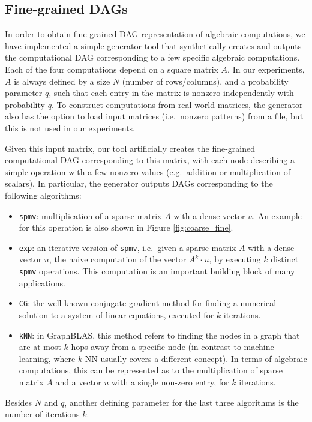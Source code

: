 \documentclass[sigconf,nonacm]{acmart}
\begin{document}
\subsection{Fine-grained DAGs}

In order to obtain fine-grained DAG representation of algebraic computations, we have implemented a simple generator tool that synthetically creates and outputs the computational DAG corresponding to a few specific algebraic computations. Each of the four computations depend on a square matrix $A$. In our experiments, $A$ is always defined by a size $N$ (number of rows/columns), and a probability parameter $q$, such that each entry in the matrix is nonzero independently with probability $q$. To construct computations from real-world matrices, the generator also has the option to load input matrices (i.e.\ nonzero patterns) from a file, but this is not used in our experiments.

Given this input matrix, our tool artificially creates the fine-grained computational DAG corresponding to this matrix, with each node describing a simple operation with a few nonzero values (e.g.\ addition or multiplication of scalars). In particular, the generator outputs DAGs corresponding to the following algorithms:
\begin{itemize}[topsep=4pt,itemsep=0pt,partopsep=2pt,parsep=7pt]
    \item \texttt{spmv}: multiplication of a sparse matrix $A$ with a dense vector $u$. An example for this operation is also shown in Figure \ref{fig:coarse_fine}.
    \item \texttt{exp}: an iterative version of \texttt{spmv}, i.e.\ given a sparse matrix $A$ with a dense vector $u$, the naive computation of the vector $A^k _{\!} \cdot _{\!} u$, by executing $k$ distinct \texttt{spmv} operations. This computation is an important building block of many applications.
    \item \texttt{CG}: the well-known conjugate gradient method for finding a numerical solution to a system of linear equations, executed for $k$ iterations.
    \item \texttt{kNN}: in GraphBLAS, this method refers to finding the nodes in a graph that are at most $k$ hops away from a specific node (in contrast to machine learning, where $k$-NN usually covers a different concept). In terms of algebraic computations, this can be represented as to the multiplication of sparse matrix $A$ and a vector $u$ with a single non-zero entry, for $k$ iterations.
\end{itemize}
Besides $N$ and $q$, another defining parameter for the last three algorithms is the number of iterations $k$.
\end{document}
